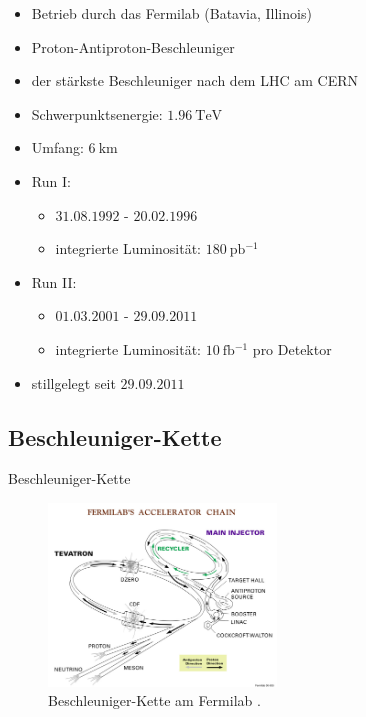 \documentclass[aspectratio=1610, 9pt]{beamer}
\begin{document}
\begin{frame}
    \begin{itemize}
      \item Betrieb durch das Fermilab (Batavia, Illinois)
      \item Proton-Antiproton-Beschleuniger
      \item der stärkste Beschleuniger nach dem LHC am CERN
      \item Schwerpunktsenergie: $\SI{1,96}{\TeV}$
      \item Umfang: $\SI{6}{\km}$
      \item Run I:
      \begin{itemize}
        \item $31.08.1992$ - $20.02.1996$
        \item integrierte Luminosität: $\SI{180}{\pico \barn^{-1}}$
      \end{itemize}
      \item Run II:
      \begin{itemize}
        \item $01.03.2001$ - $29.09.2011$
        \item integrierte Luminosität: $\SI{10}{\femto \barn^{-1}}$ pro Detektor
      \end{itemize}
      \item stillgelegt seit $29.09.2011$
    \end{itemize}
\end{frame}

\subsection{Beschleuniger-Kette}

\begin{frame}{Beschleuniger-Kette}
  \begin{figure}
    \includegraphics[width=0.54\textwidth]{images/accelerator_chain.jpg}
    \caption{Beschleuniger-Kette am Fermilab \cite{accelerator_chain}.}
  \end{figure}
\end{frame}
\end{document}
